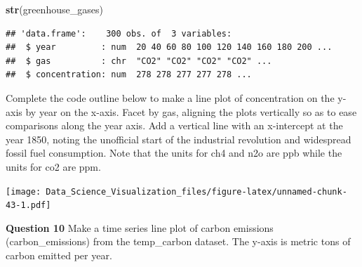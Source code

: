 \documentclass[
]{article}
\newenvironment{Shaded}{\begin{snugshade}}{\end{snugshade}}
\newcommand{\DataTypeTok}[1]{\textcolor[rgb]{0.13,0.29,0.53}{#1}}
\newcommand{\DecValTok}[1]{\textcolor[rgb]{0.00,0.00,0.81}{#1}}
\newcommand{\KeywordTok}[1]{\textcolor[rgb]{0.13,0.29,0.53}{\textbf{#1}}}
\newcommand{\NormalTok}[1]{#1}
\newcommand{\OperatorTok}[1]{\textcolor[rgb]{0.81,0.36,0.00}{\textbf{#1}}}
\newcommand{\StringTok}[1]{\textcolor[rgb]{0.31,0.60,0.02}{#1}}
\begin{document}
\begin{Shaded}
\begin{Highlighting}[]
\KeywordTok{str}\NormalTok{(greenhouse_gases)}
\end{Highlighting}
\end{Shaded}

\begin{verbatim}
## 'data.frame':    300 obs. of  3 variables:
##  $ year         : num  20 40 60 80 100 120 140 160 180 200 ...
##  $ gas          : chr  "CO2" "CO2" "CO2" "CO2" ...
##  $ concentration: num  278 278 277 277 278 ...
\end{verbatim}

Complete the code outline below to make a line plot of concentration on
the y-axis by year on the x-axis. Facet by gas, aligning the plots
vertically so as to ease comparisons along the year axis. Add a vertical
line with an x-intercept at the year 1850, noting the unofficial start
of the industrial revolution and widespread fossil fuel consumption.
Note that the units for ch4 and n2o are ppb while the units for co2 are
ppm.

\begin{Shaded}
\end{Shaded}

\texttt{[image: Data\_Science\_Visualization\_files/figure-latex/unnamed-chunk-43-1.pdf]}

\textbf{Question 10} Make a time series line plot of carbon emissions
(carbon\_emissions) from the temp\_carbon dataset. The y-axis is metric
tons of carbon emitted per year.
\end{document}
